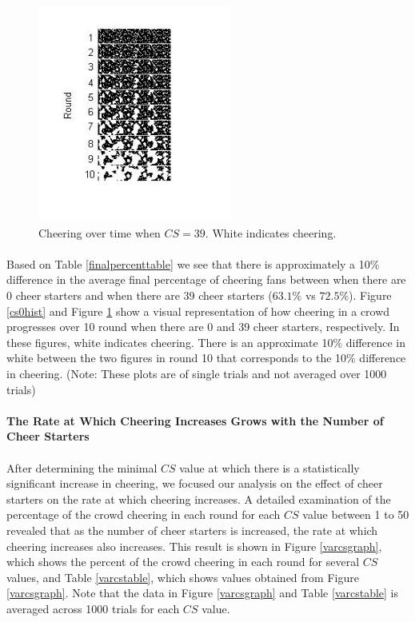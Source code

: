 \documentclass[oneside,12pt]{report}
\begin{document}
 \begin{figure} [h!]
    		\begin{center}
    			\includegraphics [width=2.5in] {n=39,46.jpg}
    			\caption [Pictorial Representation of Cheering Over Time with 39 Cheer Starters] {Cheering over time when $CS=39$. White indicates cheering.}
    		\label{cs39hist}
    		\end{center}
 \end {figure}	

\paragraph{}
Based on Table \ref{finalpercenttable} we see that there is approximately a 10\% difference in the average final percentage of cheering fans between when there are 0 cheer starters and when there are 39 cheer starters ($63.1\%$ vs $72.5\%$). Figure \ref{cs0hist} and Figure \ref{cs39hist} show a visual representation of how cheering in a crowd progresses over 10 round when there are 0 and 39 cheer starters, respectively. In these figures, white indicates cheering. There is an approximate 10\% difference in white between the two figures in round 10 that corresponds to the 10\% difference in cheering. (Note: These plots are of single trials and not averaged over 1000 trials)

\paragraph{The Rate at Which Cheering Increases Grows with the Number of Cheer Starters}
\paragraph{}
After determining the minimal $CS$ value at which there is a statistically significant increase in cheering, we focused our analysis on the effect of cheer starters on the rate at which cheering increases. A detailed examination of the percentage of the crowd cheering in each round for each $CS$ value between 1 to 50 revealed that as the number of cheer starters is increased, the rate at which cheering increases also increases. This result is shown in Figure \ref{varcsgraph}, which shows the percent of the crowd cheering in each round for several $CS$ values, and Table \ref{varcstable}, which shows values obtained from Figure \ref{varcsgraph}. Note that the data in Figure \ref{varcsgraph} and Table \ref{varcstable} is averaged across 1000 trials for each $CS$ value. 
\end{document}
